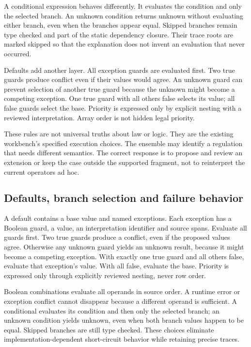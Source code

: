 \documentclass[12pt,a4paper,oneside,openany]{book}
\begin{document}
A conditional expression behaves differently. It evaluates the condition and
only the selected branch. An unknown condition returns unknown without evaluating
either branch, even when the branches appear equal. Skipped branches remain type
checked and part of the static dependency closure. Their trace roots are marked
skipped so that the explanation does not invent an evaluation that never occurred.

Defaults add another layer. All exception guards are evaluated first. Two true
guards produce conflict even if their values would agree. An unknown guard can
prevent selection of another true guard because the unknown might become a
competing exception. One true guard with all others false selects its value; all
false guards select the base. Priority is expressed only by explicit nesting with
a reviewed interpretation. Array order is not hidden legal priority.

These rules are not universal truths about law or logic. They are the existing
workbench's specified execution choices. The ensemble may identify a regulation
that needs different semantics. The correct response is to propose and review an
extension or keep the case outside the supported fragment, not to reinterpret
the current operators ad hoc.

\subsection{Defaults, branch selection and failure behavior}
\label{merge:P-03a-rule-contract:02}


A default contains a base value and named exceptions. Each exception has a
Boolean guard, a value, an interpretation identifier and source spans. Evaluate
all guards first. Two true guards produce a conflict, even if the proposed values
agree. Otherwise any unknown guard yields an unknown result, because it might
become a competing exception. With exactly one true guard and all others false,
evaluate that exception's value. With all false, evaluate the base. Priority is
expressed only through explicitly reviewed nesting, never row order.

Boolean combinations evaluate all operands in source order. A runtime error or
exception conflict cannot disappear because a different operand is sufficient.
A conditional evaluates its condition and then only the selected branch; an
unknown condition yields unknown, even when both branch values happen to be
equal. Skipped branches are still type checked. These choices eliminate
implementation-dependent short-circuit behavior while retaining precise traces.
\end{document}
